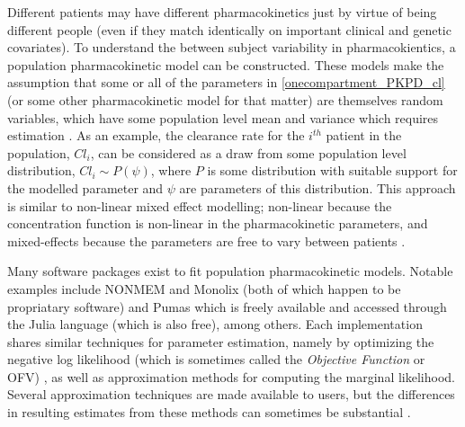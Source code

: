 Different patients may have different pharmacokinetics just by virtue of being different people (even if they match identically on important clinical and genetic covariates).  To understand the between subject variability in pharmacokientics, a population pharmacokinetic model can be constructed.  These models make the assumption that some or all of the parameters in \cref{onecompartment_PKPD_cl} (or some other pharmacokinetic model for that matter) are themselves random variables, which have some population level mean and variance which requires estimation \cite{owen2014introduction}.  As an example, the clearance rate for the $i^{th}$ patient in the population, $Cl_i$, can be considered as a draw from some population level distribution, $Cl_i \sim P(\psi) $, where $P$ is some distribution with suitable support for the modelled parameter and $\psi$ are parameters of this distribution.  This approach is similar to non-linear mixed effect modelling; non-linear because the concentration function is non-linear in the pharmacokinetic parameters, and mixed-effects because the parameters are free to vary between patients \cite{owen2014introduction, mould2013basic}.

Many software packages exist to fit population pharmacokinetic models.  Notable examples  include NONMEM \cite{bauer2011nonmem} and Monolix \cite{noauthor_monolix_nodate} (both of which happen to be propriatary software) and Pumas \cite{rackauckas2020accelerated} which is freely available and accessed through the Julia language (which is also free), among others.  Each implementation shares similar techniques for parameter estimation, namely by optimizing the negative log likelihood (which is sometimes called the \textit{Objective Function} or OFV) \cite{bauer2011nonmem, mould2013basic, bauer_nonmem_2019}, as well as approximation methods for computing the marginal likelihood.  Several approximation techniques are made available to users, but the differences in resulting estimates from these methods can sometimes be substantial \cite{mould2013basic}.